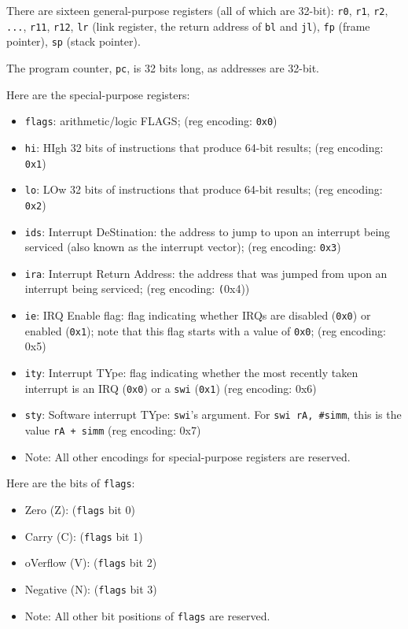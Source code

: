 \documentclass{article}
\begin{document}
	\doublespacing
	There are sixteen general-purpose registers (all of which are 32-bit):
	\texttt{r0}, \texttt{r1},
	\texttt{r2}, \texttt{...}, \texttt{r11}, \texttt{r12},
	\texttt{lr} (link register, the return address of \texttt{bl} and
		\texttt{jl}),
	\texttt{fp} (frame pointer), \texttt{sp} (stack pointer).

	The program counter, \texttt{pc}, is 32 bits long, as addresses are
	32-bit.

	Here are the special-purpose registers:
	\singlespacing
	\begin{itemize}
	\item \texttt{flags}: arithmetic/logic FLAGS;
		(reg encoding: \texttt{0x0})
	\item \texttt{hi}:
		HIgh 32 bits of instructions that produce 64-bit results;
		(reg encoding: \texttt{0x1})
	\item \texttt{lo}:
		LOw 32 bits of instructions that produce 64-bit results;
		(reg encoding: \texttt{0x2})
	\item \texttt{ids}: Interrupt DeStination:
		the address to jump to upon an interrupt being serviced
			(also known as the interrupt vector);
		(reg encoding: \texttt{0x3})
	\item \texttt{ira}: Interrupt Return Address:
		the address that was jumped from upon an interrupt being
			serviced;
		(reg encoding: \texttt(0x4))
	\item \texttt{ie}: IRQ Enable flag:
		flag indicating whether IRQs are
			disabled (\texttt{0x0}) or enabled (\texttt{0x1});
		note that this flag starts with a value of \texttt{0x0};
		(reg encoding: 0x5)
	\item \texttt{ity}: Interrupt TYpe:
		flag indicating whether the most recently taken interrupt is an
			IRQ (\texttt{0x0}) or a \texttt{swi} (\texttt{0x1})
		(reg encoding: 0x6)
	\item \texttt{sty}: Software interrupt TYpe:
		\texttt{swi}'s argument. For \texttt{swi rA, \#simm}, this is the
			value \texttt{rA + simm}
		(reg encoding: 0x7)
	\item Note:
		All other encodings for special-purpose registers are reserved.
	\end{itemize}
	\doublespacing
	Here are the bits of \texttt{flags}:
	\singlespacing
	\begin{itemize}
	\item Zero (Z): (\texttt{flags} bit 0)
	\item Carry (C): (\texttt{flags} bit 1)
	\item oVerflow (V): (\texttt{flags} bit 2)
	\item Negative (N): (\texttt{flags} bit 3)
	\item Note:
		All other bit positions of \texttt{flags} are reserved.
	\end{itemize}
\end{document}
